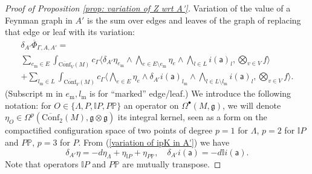 \documentclass[11pt,a4paper]{amsart}
\theoremstyle{plain} %
\theoremstyle{definition}
\theoremstyle{remark}
\newcommand{\g}{\mathfrak{g}}
\newcommand{\sfa}{\mathsf{a}}
\newcommand{\bt}{\bullet}
\newcommand{\mm}{\mathrm{m}}
\newcommand{\Conf}[1][V]{\overline{\mathrm{Conf}}_#1(M)}
\newcommand{\II}{\mathbb{I}}
\newcommand{\PP}{\mathbb{P}}
\begin{document}
{\begin{proof}[%
Proof of Proposition \ref{prop: variation of Z wrt A'}]
Variation of the value of a Feynman graph in $A'$ is the sum over edges and leaves of the graph of replacing that edge or leaf with its variation:
\begin{multline}\label{prop 4.11 delta_A' Phi}
    \delta_{A'}\overline\Phi_{\Gamma,A,A'}=\\
    \sum_{e_\mm\in E} \int_{\Conf} c_\Gamma \Big\langle \delta_{A'}\eta_{e_\mm}\wedge\bigwedge_{e\in E\setminus e_\mm}\eta_e\wedge \bigwedge_{l\in L}i(\sfa)_l,\bigotimes_{v\in V} f \Big\rangle
    \\+ \sum_{l_\mm\in L} \int_{\Conf} c_\Gamma \Big\langle 
    \bigwedge_{e\in E}\eta_e\wedge \delta_{A'}i(\sfa)_{l_\mm} \wedge\bigwedge_{l\in L\setminus l_\mm}i(\sfa)_l,\bigotimes_{v\in V} f
    \Big\rangle .
\end{multline}
(Subscript $\mm$ in $e_\mm,l_\mm$ is for ``marked'' edge/leaf.) We introduce the following notation: for $O\in \{\Lambda, P,\II P, P\PP\}$ an operator on $\Omega^\bt(M,\g)$, we will denote $\eta_O \in \Omega^p(\Conf[2],\g\otimes \g)$ its integral kernel, seen as a form on the compactified configuration space of two points of degree $p=1$ for $\Lambda$, $p=2$ for $\II P$ and $P\PP$, $p=3$ for $P$.
From (\ref{variation of ipK in A'}) we have
\begin{equation}\label{prop 4.11 delta_A' eta}
    \delta_{A'} \eta= -d\eta_\Lambda + 
    \eta_{\II P}+ \eta_{P \PP},
    \quad \delta_{A'}i(\sfa)=-d\mathbb{I}i(\sfa).
\end{equation}
Note that operators $\II P$ and $P\PP$ are mutually transpose.


\end{proof}}
\end{document}
